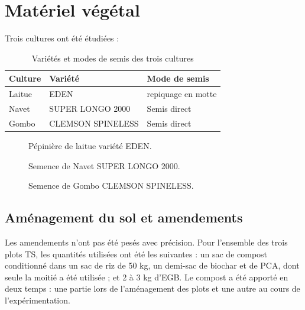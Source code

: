 \section{Matériel végétal}
Trois cultures ont été étudiées : 

\begin{table}[H]
    \centering
    \caption{Variétés et modes de semis des trois cultures}
    \label{tab:varietes_semis}
    \begin{tabular}{|p{3cm}|p{5cm}|p{5.5cm}|}
        \hline
        \textbf{Culture} & \textbf{Variété} & \textbf{Mode de semis} \\
        \hline
        Laitue & EDEN & repiquage en motte \\
        \hline
        Navet & SUPER LONGO 2000 & Semis direct \\
        \hline
        Gombo & CLEMSON SPINELESS & Semis direct \\
        \hline
    \end{tabular}
\end{table}

\begin{figure}[H]
    \centering
    \caption{Pépinière de laitue variété EDEN. }
    \label{fig:laitue2}
\end{figure}

\begin{figure}[H]
    \centering
    \caption{Semence de Navet SUPER LONGO 2000. }
    \label{fig:navet2}
\end{figure}

\begin{figure}[H]
    \centering
    \caption{Semence de Gombo CLEMSON SPINELESS. }
    \label{fig:gombo2}
\end{figure}

\subsection{Aménagement du sol et amendements}
Les amendements n'ont pas été pesés avec précision. Pour l'ensemble des trois plots TS, les quantités utilisées ont été les suivantes : 
un sac de compost conditionné dans un sac de riz de 50 kg, un demi-sac de biochar et de PCA, dont seule la moitié a été utilisée ; et 2 à 3 kg d'EGB. 
Le compost a été apporté en deux temps : une partie lors de l'aménagement des plots et une autre au cours de l'expérimentation.

